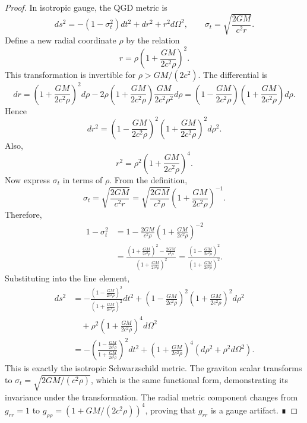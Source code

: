 \documentclass[12pt,prd,preprintnumbers,amsmath,amssymb]{revtex4-2}
\theoremstyle{definition}
\theoremstyle{remark}
\newcommand{\nn}{\nonumber}
\begin{document}
\begin{proof}
In isotropic gauge, the QGD metric is
\begin{equation}
ds^2 = -(1 - \sigma_t^2) dt^2 + dr^2 + r^2 d\Omega^2, \qquad \sigma_t = \sqrt{\frac{2GM}{c^2 r}}.
\end{equation}
Define a new radial coordinate $\rho$ by the relation
\begin{equation}
r = \rho\left(1 + \frac{GM}{2c^2\rho}\right)^2.
\end{equation}
This transformation is invertible for $\rho > GM/(2c^2)$. The differential is
\begin{equation}
dr = \left(1 + \frac{GM}{2c^2\rho}\right)^2 d\rho - 2\rho\left(1 + \frac{GM}{2c^2\rho}\right)\frac{GM}{2c^2\rho^2} d\rho = \left(1 - \frac{GM}{2c^2\rho}\right)\left(1 + \frac{GM}{2c^2\rho}\right) d\rho.
\end{equation}
Hence
\begin{equation}
dr^2 = \left(1 - \frac{GM}{2c^2\rho}\right)^2\left(1 + \frac{GM}{2c^2\rho}\right)^2 d\rho^2.
\end{equation}
Also,
\begin{equation}
r^2 = \rho^2\left(1 + \frac{GM}{2c^2\rho}\right)^4.
\end{equation}
Now express $\sigma_t$ in terms of $\rho$. From the definition,
\begin{equation}
\sigma_t = \sqrt{\frac{2GM}{c^2 r}} = \sqrt{\frac{2GM}{c^2\rho}} \left(1 + \frac{GM}{2c^2\rho}\right)^{-1}.
\end{equation}
Therefore,
\begin{align}
1 - \sigma_t^2 &= 1 - \frac{2GM}{c^2\rho}\left(1 + \frac{GM}{2c^2\rho}\right)^{-2} \nn\\
&= \frac{\left(1 + \frac{GM}{2c^2\rho}\right)^2 - \frac{2GM}{c^2\rho}}{\left(1 + \frac{GM}{2c^2\rho}\right)^2} = \frac{\left(1 - \frac{GM}{2c^2\rho}\right)^2}{\left(1 + \frac{GM}{2c^2\rho}\right)^2}.
\end{align}
Substituting into the line element,
\begin{align}
ds^2 &= -\frac{\left(1 - \frac{GM}{2c^2\rho}\right)^2}{\left(1 + \frac{GM}{2c^2\rho}\right)^2} dt^2 + \left(1 - \frac{GM}{2c^2\rho}\right)^2\left(1 + \frac{GM}{2c^2\rho}\right)^2 d\rho^2 \nn\\
&\quad + \rho^2\left(1 + \frac{GM}{2c^2\rho}\right)^4 d\Omega^2 \nn\\
&= -\left(\frac{1 - \frac{GM}{2c^2\rho}}{1 + \frac{GM}{2c^2\rho}}\right)^2 dt^2 + \left(1 + \frac{GM}{2c^2\rho}\right)^4 \left(d\rho^2 + \rho^2 d\Omega^2\right).
\end{align}
This is exactly the isotropic Schwarzschild metric. The graviton scalar transforms to $\sigma_t = \sqrt{2GM/(c^2\rho)}$, which is the same functional form, demonstrating its invariance under the transformation. The radial metric component changes from $g_{rr}=1$ to $g_{\rho\rho} = (1 + GM/(2c^2\rho))^4$, proving that $g_{rr}$ is a gauge artifact. ∎
\end{proof}
\end{document}
